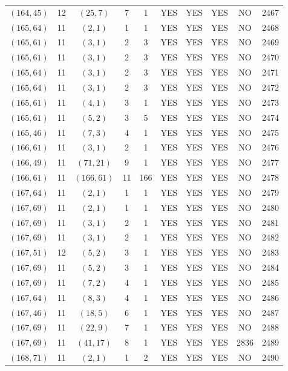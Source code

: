 \begin{longtable}{|c|c|c|c|c|c|c|c|c|c|}
$(164, 45)$ & 12 & $(25, 7)$ & 7 & 1 & YES & YES & YES & NO & 2467\\
$(165, 64)$ & 11 & $(2, 1)$ & 1 & 1 & YES & YES & YES & NO & 2468\\
$(165, 61)$ & 11 & $(3, 1)$ & 2 & 3 & YES & YES & YES & NO & 2469\\
$(165, 61)$ & 11 & $(3, 1)$ & 2 & 3 & YES & YES & YES & NO & 2470\\
$(165, 64)$ & 11 & $(3, 1)$ & 2 & 3 & YES & YES & YES & NO & 2471\\
$(165, 64)$ & 11 & $(3, 1)$ & 2 & 3 & YES & YES & YES & NO & 2472\\
$(165, 61)$ & 11 & $(4, 1)$ & 3 & 1 & YES & YES & YES & NO & 2473\\
$(165, 61)$ & 11 & $(5, 2)$ & 3 & 5 & YES & YES & YES & NO & 2474\\
$(165, 46)$ & 11 & $(7, 3)$ & 4 & 1 & YES & YES & YES & NO & 2475\\
$(166, 61)$ & 11 & $(3, 1)$ & 2 & 1 & YES & YES & YES & NO & 2476\\
$(166, 49)$ & 11 & $(71, 21)$ & 9 & 1 & YES & YES & YES & NO & 2477\\
$(166, 61)$ & 11 & $(166, 61)$ & 11 & 166 & YES & YES & YES & NO & 2478\\
$(167, 64)$ & 11 & $(2, 1)$ & 1 & 1 & YES & YES & YES & NO & 2479\\
$(167, 69)$ & 11 & $(2, 1)$ & 1 & 1 & YES & YES & YES & NO & 2480\\
$(167, 69)$ & 11 & $(3, 1)$ & 2 & 1 & YES & YES & YES & NO & 2481\\
$(167, 69)$ & 11 & $(3, 1)$ & 2 & 1 & YES & YES & YES & NO & 2482\\
$(167, 51)$ & 12 & $(5, 2)$ & 3 & 1 & YES & YES & YES & NO & 2483\\
$(167, 69)$ & 11 & $(5, 2)$ & 3 & 1 & YES & YES & YES & NO & 2484\\
$(167, 69)$ & 11 & $(7, 2)$ & 4 & 1 & YES & YES & YES & NO & 2485\\
$(167, 64)$ & 11 & $(8, 3)$ & 4 & 1 & YES & YES & YES & NO & 2486\\
$(167, 46)$ & 11 & $(18, 5)$ & 6 & 1 & YES & YES & YES & NO & 2487\\
$(167, 69)$ & 11 & $(22, 9)$ & 7 & 1 & YES & YES & YES & NO & 2488\\
$(167, 69)$ & 11 & $(41, 17)$ & 8 & 1 & YES & YES & YES & 2836 & 2489\\
$(168, 71)$ & 11 & $(2, 1)$ & 1 & 2 & YES & YES & YES & NO & 2490\\

\end{longtable}
